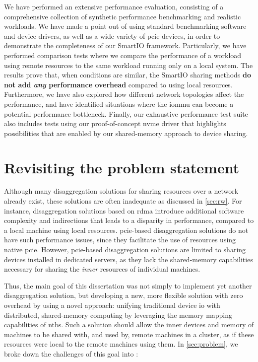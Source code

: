 We have performed an extensive performance evaluation, consisting of a comprehensive collection of synthetic performance benchmarking and realistic workloads.
%
We have made a point out of using standard benchmarking software and device drivers, as well as a wide variety of \gls{pcie} devices, in order to demonstrate the completeness of our SmartIO framework.
%
Particularly, we have performed comparison tests where we compare the performance of a workload using remote resources to the same workload running only on a local system.
%
The results prove that, when conditions are similar, the SmartIO sharing methods \textbf{do not add \emph{any} performance overhead} compared to using local resources.
%
Furthermore, we have also explored how different network topologies affect the performance, and have identified situations where the \gls{iommu} can become a potential performance bottleneck.
%
Finally, our exhaustive performance test suite also includes tests using our proof-of-concept \gls{nvme} driver that highlights possibilities that are enabled by our shared-memory approach to device sharing.






\section{Revisiting the problem statement}\label{sec:discussion}
Although many \gls{disaggregation} solutions for sharing resources over a network already exist, these solutions are often inadequate as discussed in \cref{sec:rw}. 
For instance, \gls{disaggregation} solutions based on \gls{rdma} introduce additional software complexity and indirections that leads to a disparity in performance, compared to a local machine using local resources. 
\Gls{pcie}-based \gls{disaggregation} solutions do not have such performance issues, since they facilitate the use of resources using native \gls{pcie}.
However, \gls{pcie}-based \gls{disaggregation} solutions are limited to sharing devices installed in dedicated servers, as they lack the shared-memory capabilities necessary for sharing the \emph{inner} resources of individual machines. 



Thus, the main goal of this dissertation was not simply to implement yet another \gls{disaggregation} solution, but developing a new, more flexible solution with zero overhead by using a novel approach:
%
unifying traditional device \gls{io} with distributed, shared-memory computing by leveraging the memory mapping capabilities of \glspl{ntb}.
%
Such a solution should allow the inner devices and memory of machines to be shared with, and used by, remote machines in a cluster, as if these resources were local to the remote machines using them.
%
In \cref{sec:problem}, we broke down the challenges of this goal into :



